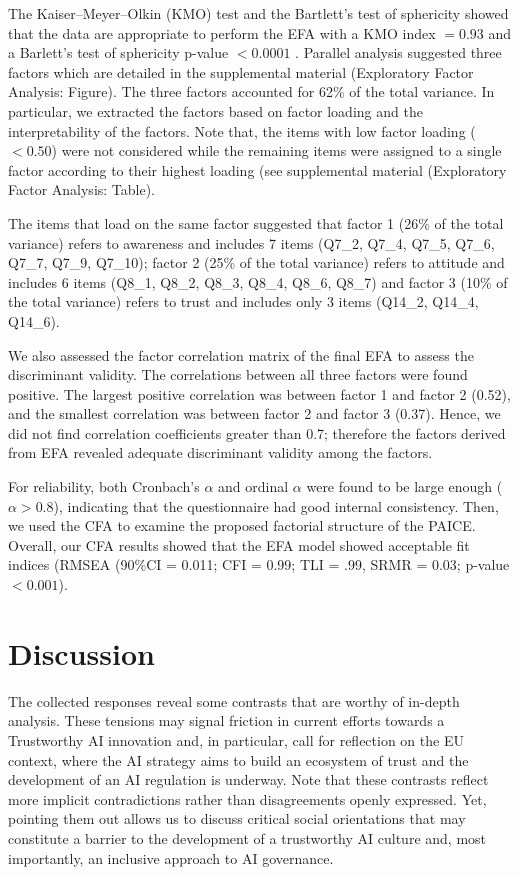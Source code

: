\documentclass{article}
\begin{document}
The Kaiser–Meyer–Olkin (KMO) test and the Bartlett’s test of sphericity showed that the data are appropriate to perform the EFA with a KMO index $=0.93$ and a Barlett's test of sphericity p-value  $<0.0001$ \cite{Kaiser1974,Fabrigar1999}. 
Parallel analysis suggested three factors which are detailed in the supplemental material (Exploratory Factor Analysis: Figure). The three factors accounted for 62\% of the total variance. In particular, we extracted the factors based on factor loading and the interpretability of the factors. Note that, the items with low factor loading ($<0.50$) were not considered while the remaining items were assigned to a single factor according to their highest loading (see supplemental material (Exploratory Factor Analysis: Table).

The items that load on the same factor suggested that factor 1 (26\% of the total variance) refers to awareness and includes 7 items (Q7\_2, Q7\_4, Q7\_5, Q7\_6, Q7\_7, Q7\_9, Q7\_10); factor 2 (25\% of the total variance) refers to attitude and includes 6 items (Q8\_1, Q8\_2, Q8\_3, Q8\_4, Q8\_6, Q8\_7) and factor 3 (10\% of the total variance) refers to trust and includes only 3 items (Q14\_2, Q14\_4, Q14\_6).

We also assessed the factor correlation matrix of the final EFA to assess the discriminant validity. The correlations between all three factors were found positive. The largest positive correlation was between factor 1 and factor 2 (0.52), and the smallest correlation was between factor 2 and factor 3 (0.37).  Hence, we did not find correlation coefficients greater than 0.7; therefore the factors derived from EFA revealed adequate discriminant validity among the factors.

For reliability, both Cronbach’s $\alpha$ and ordinal $\alpha$ were found to be large enough ($\alpha > 0.8$), indicating that the questionnaire had good internal consistency. Then, we used the CFA to examine the proposed factorial structure of the PAICE.  
Overall, our CFA results showed that the EFA model showed  acceptable fit indices (RMSEA (90\%CI = 0.011; CFI = 0.99; TLI = .99, SRMR = 0.03; p-value $<0.001$).

\section{Discussion}
\label{discuss}

The collected responses reveal some contrasts that are worthy of in-depth analysis. These tensions may signal friction in current efforts towards a Trustworthy AI innovation and, in particular, call for reflection on the EU context, where the AI strategy aims to build an ecosystem of trust and the development of an AI regulation is underway.  
Note that these contrasts reflect more implicit contradictions rather than disagreements openly expressed. 
Yet, pointing them out allows us to discuss critical social orientations that may constitute a barrier to the development of a trustworthy AI culture and, most importantly, an inclusive approach to AI governance.
\end{document}
